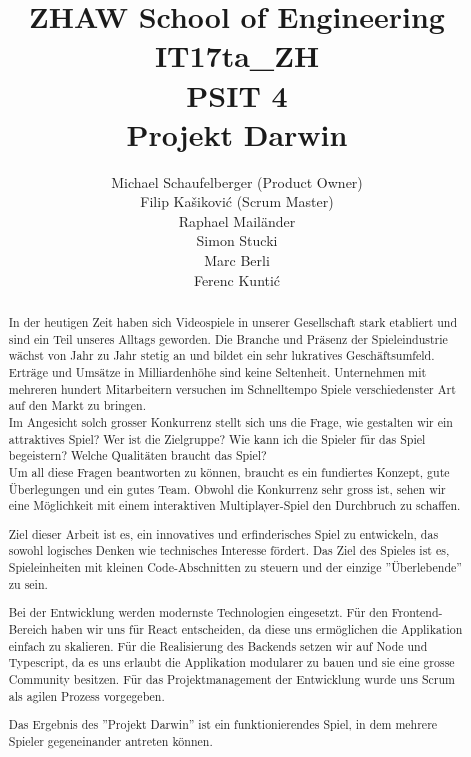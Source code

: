 \documentclass[11pt,a4paper,titlepage]{article}
\author{Michael Schaufelberger (Product Owner)\\
Filip Kašiković (Scrum Master)\\
Raphael Mailänder\\
Simon Stucki\\
Marc Berli\\
Ferenc Kuntić}
\title{
ZHAW School of Engineering\\
IT17ta\_ZH\\
PSIT 4\\
Projekt Darwin}
\begin{document}
\maketitle

\begin{otherlanguage}{english}
\begin{abstract}

In der heutigen Zeit haben sich Videospiele in unserer Gesellschaft stark etabliert und sind ein Teil unseres Alltags geworden. Die Branche und Präsenz der Spieleindustrie wächst von Jahr zu Jahr stetig an und bildet ein sehr lukratives Geschäftsumfeld. Erträge und Umsätze in Milliardenhöhe sind keine Seltenheit. Unternehmen mit mehreren hundert Mitarbeitern versuchen im Schnelltempo Spiele verschiedenster Art auf den Markt zu bringen. 
\\Im Angesicht solch grosser Konkurrenz stellt sich uns die Frage, wie gestalten wir ein attraktives Spiel? Wer ist die Zielgruppe? Wie kann ich die Spieler für das Spiel begeistern? Welche Qualitäten braucht das Spiel?
\\Um all diese Fragen beantworten zu können, braucht es ein fundiertes Konzept, gute Überlegungen und ein gutes Team. Obwohl die Konkurrenz sehr gross ist, sehen wir eine Möglichkeit mit einem interaktiven Multiplayer-Spiel den Durchbruch zu schaffen.

Ziel dieser Arbeit ist es, ein innovatives und erfinderisches Spiel zu entwickeln, das sowohl logisches Denken wie technisches Interesse fördert. Das Ziel des Spieles ist es, Spieleinheiten mit kleinen Code-Abschnitten zu steuern und der einzige ''Überlebende'' zu sein.

Bei der Entwicklung werden modernste Technologien eingesetzt. Für den Frontend-Bereich haben wir uns für React entscheiden, da diese uns ermöglichen die Applikation einfach zu skalieren. Für die Realisierung des Backends setzen wir auf Node und Typescript, da es uns erlaubt die Applikation modularer zu bauen und sie eine grosse Community besitzen.
Für das Projektmanagement der Entwicklung wurde uns Scrum als agilen Prozess vorgegeben.

Das Ergebnis des ''Projekt Darwin'' ist ein funktionierendes Spiel, in dem mehrere Spieler gegeneinander antreten können.

\end{abstract}
\end{otherlanguage}
\end{document}
